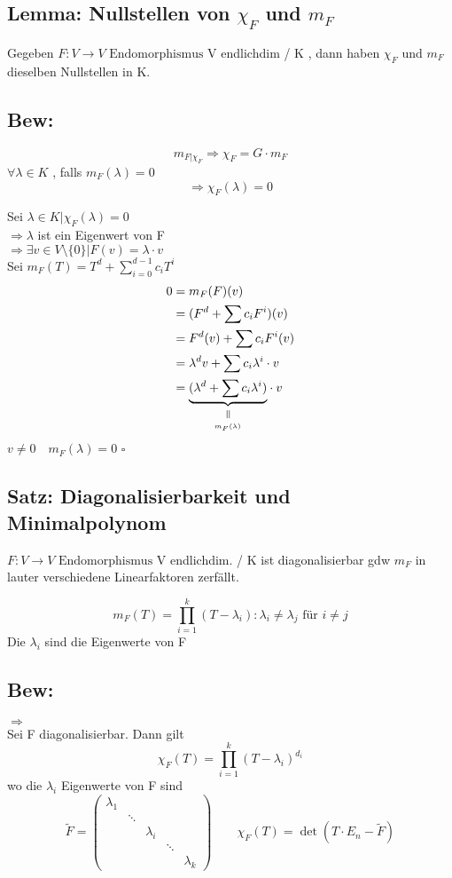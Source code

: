 \documentclass[titlepage,12pt,a4paper,ngerman]{report}
\newenvironment{bew}[1]{\subsection{Bew: #1}}{\hfill$\square$}
\newcommand{\Bew}[2]{\begin{bew}{#1}#2\end{bew}}
\newcommand{\verteq}{\rotatebox{90}{$\,=$}}
\newcommand{\equalto}[2]{\underset{\scriptstyle\overset{\mkern4mu\verteq}{#2}}{#1}}
\newcommand{\tx}[1]{\textrm{#1}}
\newcommand{\ub}[1]{\underbrace{#1}}
\newcommand{\enph}{F: V \to V \textrm{ Endomorphismus}}
\begin{document}
\subsection{Lemma: Nullstellen von $ \chi_F $ und $ m_F $}
Gegeben $\enph$ V endlichdim / K , dann haben $\chi_F$ und $m_F$ dieselben Nullstellen in K.
\Bew{}{
$$m_{F|\chi_F} \Rightarrow \chi_F = G \cdot m_F$$
$\forall \lambda \in K$ , falls $m_F(\lambda) = 0$
$$ \Rightarrow \chi_F(\lambda) = 0$$

Sei $\lambda \in K | \chi_F(\lambda) = 0$\\
$\Rightarrow \lambda$ ist ein Eigenwert von F \\
$\Rightarrow \exists v \in V\setminus \{0\} | F(v) = \lambda\cdot v$\\
Sei $m_F(T) = T^d + \sum_{i=0}^{d-1} c_i T^i$\\
\begin{align*}
0 &= m_F(F) (v)\\
&= (F^d + \sum c_i F^i)(v)\\
&= F^d(v) + \sum c_i F^i(v) \\
&= \lambda^d v + \sum c_i \lambda^i \cdot v\\
&= \equalto{\ub{(\lambda^d + \sum c_i \lambda^i)}}{_{m_F(\lambda)}} \cdot v
\end{align*}
$v\neq 0 \quad m_F(\lambda) = 0$
}

\subsection{Satz: Diagonalisierbarkeit und Minimalpolynom}
$\enph$ V endlichdim. / K ist diagonalisierbar gdw $m_F$ in lauter verschiedene Linearfaktoren zerfällt.

$$m_F(T) = \prod_{i=1}^{k} (T-\lambda_i) : \lambda_i \neq \lambda_j \tx{ für } i\neq j $$
Die $\lambda_i$ sind die Eigenwerte von F
\subsection{Bew:}
$ \boxed{\Rightarrow} $\\
Sei F diagonalisierbar. Dann gilt 
$$\chi_F(T) = \prod_{i=1}^{k} (T-\lambda_i)^{d_i}$$
wo die $ \lambda_i $ Eigenwerte von F sind
$$ \tilde{F} = \begin{pmatrix}
\lambda_1 \\
& \ddots\\
& & \lambda_i \\
& & & \ddots\\
& & & & \lambda_k
\end{pmatrix} \qquad \chi_F(T) = \det(T\cdot E_n - \tilde{F})$$
\end{document}
